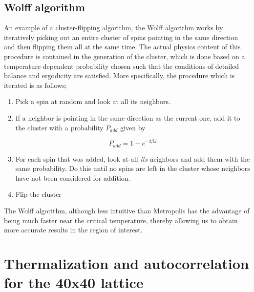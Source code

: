 \documentclass[11pt,a4paper]{article}
\begin{document}
\subsection{Wolff algorithm}
An example of a cluster-flipping algorithm, the Wolff algorithm works by iteratively picking out
 an entire cluster of spins pointing in the same direction and then flipping them all at the same time. The actual physics content of this 
 procedure is contained in the generation of the cluster, which is done based on a temperature dependent probability chosen such that the
 conditions of detailed balance and ergodicity are satisfied.
 More specifically, the procedure which is iterated is as follows;
 \begin{enumerate}
 \item Pick a spin at random and look at all its neighbors.
 \item If a neighbor is pointing in the same direction as the current one, add it to the cluster with a probability $P_{add}$ given by

\begin{equation}\label{eq:A-ratio}
    P_{add} = 1 - e^{-2\beta J}
\end{equation}
 

 \item For each spin that was added, look at all \textit{its} neighbors and add them with the same probability. Do this until no spins are left
 in the cluster whose neighbors have not been considered for addition.
 \item Flip the cluster

 \end{enumerate}

The Wolff algorithm, although less intuitive than Metropolis has the advantage of being much faster near the critical temperature, thereby
 allowing us to obtain more accurate results in the region of interest.


\pagebreak






\section{Thermalization and autocorrelation for the 40x40 lattice}
\end{document}
